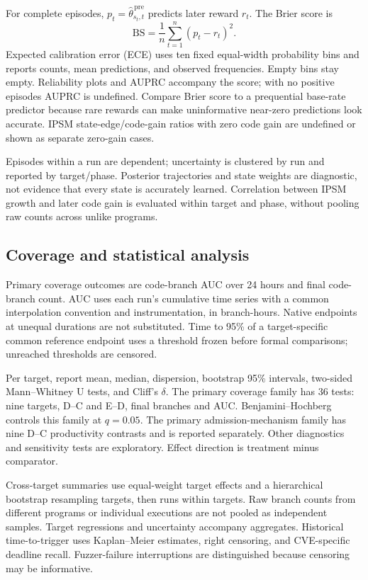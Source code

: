 \documentclass[final,5p,times,number]{elsarticle}
\begin{document}
For complete episodes, $p_t=\widehat{\theta}_{s_t,t}^{\,\mathrm{pre}}$ predicts later reward $r_t$. The Brier score is
\begin{equation}
\mathrm{BS}=\frac{1}{n}\sum_{t=1}^{n}(p_t-r_t)^2.
\end{equation}
Expected calibration error (ECE) uses ten fixed equal-width probability bins and reports counts, mean predictions, and observed frequencies. Empty bins stay empty. Reliability plots and AUPRC accompany the score; with no positive episodes AUPRC is undefined. Compare Brier score to a prequential base-rate predictor because rare rewards can make uninformative near-zero predictions look accurate. IPSM state-edge/code-gain ratios with zero code gain are undefined or shown as separate zero-gain cases.

Episodes within a run are dependent; uncertainty is clustered by run and reported by target/phase. Posterior trajectories and state weights are diagnostic, not evidence that every state is accurately learned. Correlation between IPSM growth and later code gain is evaluated within target and phase, without pooling raw counts across unlike programs.

\subsection{Coverage and statistical analysis}
Primary coverage outcomes are code-branch AUC over 24 hours and final code-branch count. AUC uses each run's cumulative time series with a common interpolation convention and instrumentation, in branch-hours. Native endpoints at unequal durations are not substituted. Time to 95\% of a target-specific common reference endpoint uses a threshold frozen before formal comparisons; unreached thresholds are censored.

Per target, report mean, median, dispersion, bootstrap 95\% intervals, two-sided Mann--Whitney U tests, and Cliff's $\delta$. The primary coverage family has 36 tests: nine targets, D--C and E--D, final branches and AUC. Benjamini--Hochberg controls this family at $q=0.05$. The primary admission-mechanism family has nine D--C productivity contrasts and is reported separately. Other diagnostics and sensitivity tests are exploratory. Effect direction is treatment minus comparator.

Cross-target summaries use equal-weight target effects and a hierarchical bootstrap resampling targets, then runs within targets. Raw branch counts from different programs or individual executions are not pooled as independent samples. Target regressions and uncertainty accompany aggregates. Historical time-to-trigger uses Kaplan--Meier estimates, right censoring, and CVE-specific deadline recall. Fuzzer-failure interruptions are distinguished because censoring may be informative.
\end{document}
